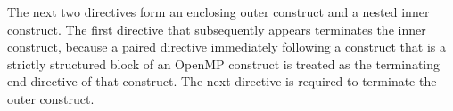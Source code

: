 \begin{fortranspecific}[4ex]
The next two  directives form an enclosing outer  construct 
and a nested inner  construct. The first  directive
that subsequently appears terminates the inner  construct, 
because a paired  directive immediately following a  construct that is 
a strictly structured block of an OpenMP construct is treated as the terminating end directive 
of that construct. 
The next  directive is required to terminate the outer  construct.

\end{fortranspecific}
